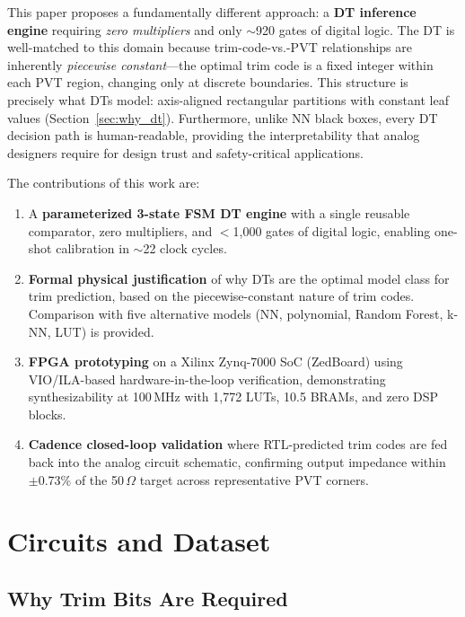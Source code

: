 \documentclass[lettersize,journal]{IEEEtran}
\begin{document}
This paper proposes a fundamentally different approach: a \textbf{DT inference engine} requiring \textit{zero multipliers} and only $\sim$920 gates of digital logic. The DT is well-matched to this domain because trim-code-vs.-PVT relationships are inherently \textit{piecewise constant}---the optimal trim code is a fixed integer within each PVT region, changing only at discrete boundaries. This structure is precisely what DTs model: axis-aligned rectangular partitions with constant leaf values (Section~\ref{sec:why_dt}). Furthermore, unlike NN black boxes, every DT decision path is human-readable, providing the interpretability that analog designers require for design trust and safety-critical applications.

The contributions of this work are:
\begin{enumerate}
\item A \textbf{parameterized 3-state FSM DT engine} with a single reusable comparator, zero multipliers, and $<$1,000 gates of digital logic, enabling one-shot calibration in $\sim$22 clock cycles.
\item \textbf{Formal physical justification} of why DTs are the optimal model class for trim prediction, based on the piecewise-constant nature of trim codes. Comparison with five alternative models (NN, polynomial, Random Forest, k-NN, LUT) is provided.
\item \textbf{FPGA prototyping} on a Xilinx Zynq-7000 SoC (ZedBoard) using VIO/ILA-based hardware-in-the-loop verification, demonstrating synthesizability at 100\,MHz with 1,772 LUTs, 10.5 BRAMs, and zero DSP blocks.
\item \textbf{Cadence closed-loop validation} where RTL-predicted trim codes are fed back into the analog circuit schematic, confirming output impedance within $\pm$0.73\% of the 50\,$\Omega$ target across representative PVT corners.
\end{enumerate}


\section{Circuits and Dataset}

\subsection{Why Trim Bits Are Required}
\end{document}
